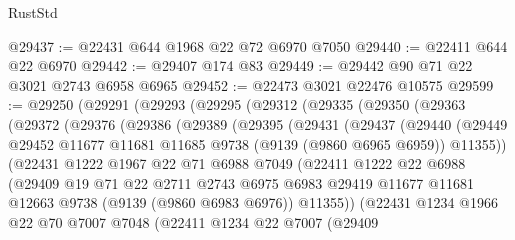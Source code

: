 \begin{lexlean}{RustStd}
\begin{coremodule}
@29437 := @22431 @644 @1968 @22 @72 @6970 @7050
@29440 := @22411 @644 @22 @6970
@29442 := @29407 @174 @83
@29449 := @29442 @90 @71 @22 @3021 @2743 @6958 @6965
@29452 := @22473 @3021 @22476 @10575
@29599 := @29250
    (@29291
      (@29293
        (@29295
          (@29312
            (@29335
              (@29350
                (@29363
                  (@29372
                    (@29376
                      (@29386
                        (@29389
                          (@29395
                            (@29431
                              (@29437
                                (@29440
                                  (@29449
                                    @29452
                                    @11677
                                    @11681
                                    @11685
                                    @9738
                                    (@9139 (@9860 @6965 @6959))
                                    @11355))
                                (@22431
                                  @1222
                                  @1967
                                  @22
                                  @71
                                  @6988
                                  @7049
                                  (@22411
                                    @1222
                                    @22
                                    @6988
                                    (@29409
                                      @19
                                      @71
                                      @22
                                      @2711
                                      @2743
                                      @6975
                                      @6983
                                      @29419
                                      @11677
                                      @11681
                                      @12663
                                      @9738
                                      (@9139 (@9860 @6983 @6976))
                                      @11355))
                                  (@22431
                                    @1234
                                    @1966
                                    @22
                                    @70
                                    @7007
                                    @7048
                                    (@22411
                                      @1234
                                      @22
                                      @7007
                                      (@29409

\end{coremodule}
\end{lexlean}
